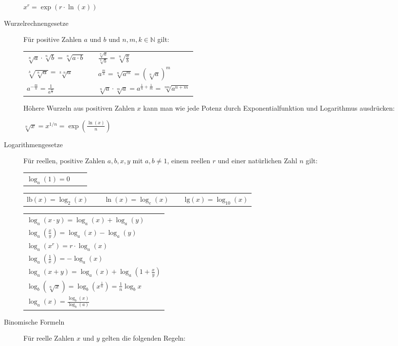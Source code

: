 \documentclass[9pt,ngerman,a4paper,landscape]{scrartcl}
\begin{document}
\begin{multicols}{3}
\begin{description}
\(\displaystyle x^{r} = \exp\left(r \cdot \ln(x)\right)\)
\item[Wurzelrechnengesetze]
Für positive Zahlen \(a\) und \(b\) und \(n,m,k \in \mathbb{N}\) gilt:

\begin{tabular}{ l c l }
$\displaystyle \sqrt[n]{a}\cdot\sqrt[n]{b}=\sqrt[n]{a\cdot b}$ & & 
$\displaystyle \frac{\sqrt[n]{a}}{\sqrt[n]{b}}=\sqrt[n]{\frac{a}{b}}$ \\
$\displaystyle \sqrt[k]{\sqrt[n]{a}}=\sqrt[k\cdot n]{a}$ & & 
$\displaystyle a^{\frac{m}{n}}=\sqrt[n]{a^m}=\left(\sqrt[n]{a} \right)^m$ \\
$\displaystyle a^{-\frac{m}{n}}=\frac{1}{a^\frac{m}{n}}$ & &
$\displaystyle \sqrt[n]{a}\cdot\sqrt[m]{a}=a^{\frac{1}{n}+\frac{1}{m}}=\sqrt[nm]{a^{n+m}}$ \\
\end{tabular}

Höhere Wurzeln aus positiven Zahlen \(x\) kann man wie jede Potenz durch
Exponentialfunktion und Logarithmus ausdrücken:

\(\displaystyle \sqrt[n]{x} = x^{1/n} = \exp\left(\frac{\ln(x)}{n}\right)\)
\item[Logarithmengesetze]
Für reellen, positive Zahlen \(a,b, x, y\) mit \(a, b \neq 1\), einem
reellen \(r\) und einer natürlichen Zahl \(n\) gilt:

\begin{tabular}{ l c l }
    $\displaystyle \log_a(1) = 0$ & & \\
\end{tabular}

\begin{tabular}{ l c l c l}
    $\displaystyle \text{lb}(x) = \log_2(x)$ & $\;$ & $\displaystyle \ln(x) = \log_e(x)$ & $\;$ & $\displaystyle \text{lg}(x) = \log_{10}(x)$ \\
\end{tabular}

\begin{tabular}{ l }
    $\displaystyle \log_a (x \cdot y) = \log_a(x) + \log_a(y)$ \\
    $\displaystyle \log_a \left(\frac{x}{y}\right) = \log_a(x) - \log_a(y)$ \\
    $\displaystyle \log_a(x^r) = r \cdot \log_a(x)$ \\
    $\displaystyle \log_a\left(\frac{1}{x}\right) = - \log_a(x)$ \\
    $\displaystyle \log_a(x + y) = \log_a(x) + \log_a\left(1+ \frac{x}{y}\right)$ \\
    $\displaystyle \log_b\left(\sqrt[n]{x}\right) = \log_b \left(x^{\frac 1n}\right) = \frac 1n\log_b x$ \\
    $\displaystyle \log_a(x) = \frac{\log_b(x)}{\log_b(a)}$
\end{tabular}
\item[Binomische Formeln]
Für reelle Zahlen \(x\) und \(y\) gelten die folgenden Regeln:


\end{description}
\end{multicols}
\end{document}
